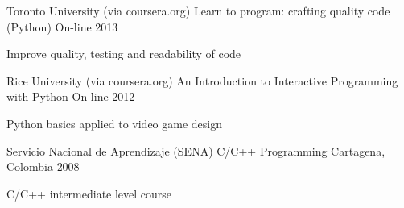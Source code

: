 \begin{cventries}
  \cventry
    {Toronto University (via coursera.org)} %
    {Learn to program: crafting quality code (Python)} %
    {On-line} %
    {2013} %
    {
      \begin{cvitems} %
        \item {Improve quality, testing and readability of code}
      \end{cvitems}
    }

  \cventry
    {Rice University (via coursera.org)} %
    {An Introduction to Interactive Programming with Python} %
    {On-line} %
    {2012} %
    {
      \begin{cvitems} %
        \item {Python basics applied to video game design}
      \end{cvitems}
    }
  \cventry
    {Servicio Nacional de Aprendizaje (SENA)} %
    {C/C++ Programming} %
    {Cartagena, Colombia} %
    {2008} %
    {
      \begin{cvitems} %
        \item {C/C++ intermediate level course}
      \end{cvitems}
    }

\end{cventries}
